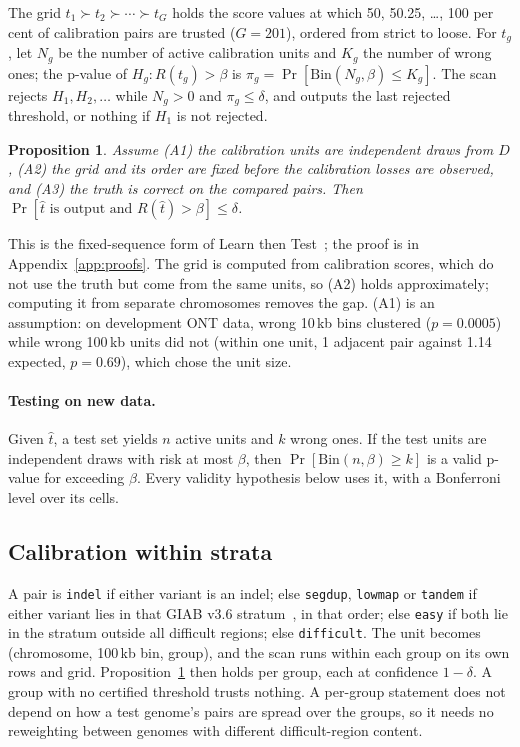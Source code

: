 \documentclass[11pt]{article}
\newcommand{\Bin}{\mathrm{Bin}}
\newtheorem{proposition}{Proposition}
\theoremstyle{definition}
\theoremstyle{remark}
\begin{document}
The grid $t_1\succ t_2\succ\cdots\succ t_G$ holds the score values at which
50, 50.25, \dots, 100 per cent of calibration pairs are trusted ($G=201$),
ordered from strict to loose. For $t_g$, let $N_g$ be the number of active
calibration units and $K_g$ the number of wrong ones; the p-value of
$H_g:R(t_g)>\beta$ is $\pi_g=\Pr[\Bin(N_g,\beta)\le K_g]$. The scan rejects
$H_1,H_2,\dots$ while $N_g>0$ and $\pi_g\le\delta$, and outputs the last
rejected threshold, or nothing if $H_1$ is not rejected.

\begin{proposition}\label{prop:guarantee}
Assume (A1) the calibration units are independent draws from $D$, (A2) the
grid and its order are fixed before the calibration losses are observed,
and (A3) the truth is correct on the compared pairs. Then
$\Pr[\hat t\text{ is output and }R(\hat t)>\beta]\le\delta$.
\end{proposition}

This is the fixed-sequence form of Learn then Test~\cite{ltt2025}; the
proof is in Appendix~\ref{app:proofs}. The grid is computed from
calibration scores, which do not use the truth but come from the same
units, so (A2) holds approximately; computing it from separate chromosomes
removes the gap. (A1) is an assumption: on development ONT data, wrong
10\,kb bins clustered ($p=0.0005$) while wrong 100\,kb units did not (within
one unit, 1 adjacent pair against 1.14 expected, $p=0.69$), which chose the
unit size.

\paragraph{Testing on new data.} Given $\hat t$, a test set yields $n$ active
units and $k$ wrong ones. If the test units are independent draws with risk
at most $\beta$, then $\Pr[\Bin(n,\beta)\ge k]$ is a valid p-value for
exceeding $\beta$. Every validity hypothesis below uses it, with a
Bonferroni level over its cells.

\subsection{Calibration within strata}\label{sec:strata}

A pair is \texttt{indel} if either variant is an indel; else
\texttt{segdup}, \texttt{lowmap} or \texttt{tandem} if either variant lies
in that GIAB v3.6 stratum~\cite{dwarshuis2024}, in that order; else
\texttt{easy} if both lie in the stratum outside all difficult regions;
else \texttt{difficult}. The unit becomes (chromosome, 100\,kb bin, group),
and the scan runs within each group on its own rows and grid.
Proposition~\ref{prop:guarantee} then holds per group, each at confidence
$1-\delta$. A group with no certified threshold trusts nothing. A per-group
statement does not depend on how a test genome's pairs are spread over the
groups, so it needs no reweighting between genomes with different
difficult-region content.
\end{document}
